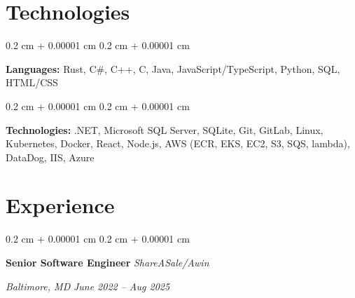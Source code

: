 \documentclass[10pt, letterpaper]{article}
\newenvironment{onecolentry}{
    \begin{adjustwidth}{
            0.2 cm + 0.00001 cm
        }{
            0.2 cm + 0.00001 cm
        }
    }{
    \end{adjustwidth}
} %
\newenvironment{twocolentry}[2][]{
    \onecolentry
    \def\secondColumn{#2}
    \setcolumnwidth{\fill, 10.5 cm}
    \begin{paracol}{2}
    }{
        \switchcolumn \raggedleft \secondColumn
    \end{paracol}
    \endonecolentry
} %
\begin{document}
\section{Technologies}
\begin{onecolentry}
    \textbf{Languages:} Rust, C\#, C++, C, Java, JavaScript/TypeScript, Python, SQL, HTML/CSS
\end{onecolentry}
\vspace{0.2 cm}
\begin{onecolentry}
    \textbf{Technologies:} .NET, Microsoft SQL Server, SQLite, Git, GitLab, Linux, Kubernetes, Docker, React, Node.js, AWS (ECR, EKS, EC2, S3, SQS, lambda), DataDog, IIS, Azure
\end{onecolentry}
\section{Experience}
\begin{twocolentry}{
    \textit{Baltimore, MD}
    \textit{June 2022 – Aug 2025}}
    \textbf{Senior Software Engineer}
    \newline
    \textit{ShareASale/Awin}
\end{twocolentry}
\end{document}
